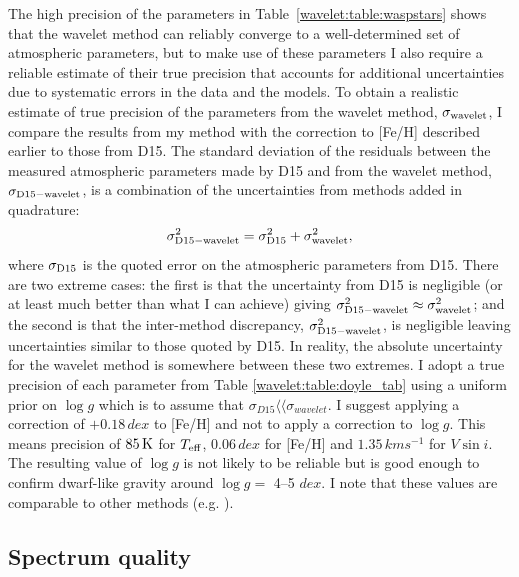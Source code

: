 The high precision of the parameters in Table~\ref{wavelet:table:waspstars} shows that the wavelet method can reliably converge to a well-determined set of atmospheric parameters, but to make use of these parameters I also require a reliable estimate of their true precision that accounts for additional uncertainties due to systematic errors in the data and the models. To obtain a realistic estimate of true precision of the parameters from the wavelet method, $\sigma_{\rm wavelet}$, I compare the results from my method with the correction to [Fe/H] described earlier to those from D15. The standard deviation of the residuals between the measured atmospheric parameters made by D15 and from the wavelet method, $\sigma_{\rm D15 - \rm wavelet}$, is a combination of the uncertainties from methods added in quadrature:
\begin{equation}
\sigma_{\rm D15 - \rm wavelet}^2 = \sigma_{\rm D15}^2 + \sigma_{\rm wavelet}^2,
\end{equation}
where $\sigma_{\rm D15}$ is the quoted error on the atmospheric parameters from D15. There are two extreme cases: the first is that the uncertainty from D15 is negligible (or at least much better than what I can achieve) giving $\sigma_{\rm D15 - \rm wavelet}^2 \approx \sigma_{\rm wavelet}^2$; and the second is that the inter-method discrepancy, $\sigma_{\rm D15 - \rm wavelet}^2$, is negligible leaving uncertainties similar to those quoted by D15. In reality, the absolute uncertainty for the wavelet method is somewhere between these two extremes. I adopt a true precision of each parameter from Table \ref{wavelet:table:doyle_tab} using a uniform prior on $\log g$ which is to assume that $\sigma_{D15} \langle \langle \sigma_{wavelet}$. I suggest applying a correction of $+0.18\,dex$ to [Fe/H] and not to apply a correction to $\log g$. This means precision of $85\, \rm K$ for $T_{\rm eff}$, $0.06\, dex$ for [Fe/H] and $1.35\,kms^{-1}$ for $V \sin i$. The resulting value of $\log g$ is not likely to be reliable but is good enough to confirm dwarf-like gravity around $\log g = $ 4--5 $dex$. I note that these values are comparable to other methods (e.g. \citealt{2010MNRAS.405.1907B}).



\subsection{Spectrum quality}\label{wavelet:spec_quality}

